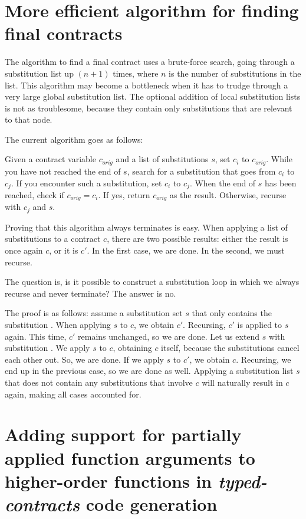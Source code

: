 \documentclass[10pt]{report}
\newcommand{\code}[1]{%
  {%
   \setlength{\fboxsep}{-2\fboxrule}%
   \fcolorbox{black}{light-gray}{\hspace{1.5pt}\strut\texttt{#1}\hspace{1.5pt}}%
  }%
}
\begin{document}
\section{More efficient algorithm for finding final contracts}
\label{futurework:efficientsubstalgo}

The algorithm to find a final contract uses a brute-force search, going through a substitution list up $(n+1)$ times, where $n$ is the number of substitutions in the list. 
This algorithm may become a bottleneck when it has to trudge through a very large global substitution list.
The optional addition of local substitution lists is not as troublesome, because they contain only substitutions that are relevant to that node.

The current algorithm goes as follows:

Given a contract variable $c_{orig}$ and a list of substitutions $s$, set $c_i$ to $c_{orig}$.
While you have not reached the end of $s$, search for a substitution that goes from $c_i$ to $c_j$.
If you encounter such a substitution, set $c_i$ to $c_j$.
When the end of $s$ has been reached, check if $c_{orig} = c_i$.
If yes, return $c_{orig}$ as the result.
Otherwise, recurse with $c_j$ and $s$.

Proving that this algorithm always terminates is easy.
When applying a list of substitutions to a contract $c$, there are two possible results: either the result is once again $c$, or it is $c'$.
In the first case, we are done.
In the second, we must recurse.

The question is, is it possible to construct a substitution loop in which we always recurse and never terminate?
The answer is no.

The proof is as follows:
assume a substitution set $s$ that only contains the substitution \code{c $\mapsto$ c$'$}.
When applying $s$ to $c$, we obtain $c'$.
Recursing, $c'$ is applied to $s$ again.
This time, $c'$ remains unchanged, so we are done.
Let us extend $s$ with substitution \code{c$'$ $\mapsto$ c}.
We apply $s$ to $c$, obtaining $c$ itself, because the substitutions cancel each other out.
So, we are done.
If we apply $s$ to $c'$, we obtain $c$.
Recursing, we end up in the previous case, so we are done as well.
Applying a substitution list $s$ that does not contain any substitutions that involve $c$ will naturally result in $c$ again, making all cases accounted for.

\section{Adding support for partially applied function arguments to higher-order functions in \textit{typed-contracts} code generation}
\end{document}
